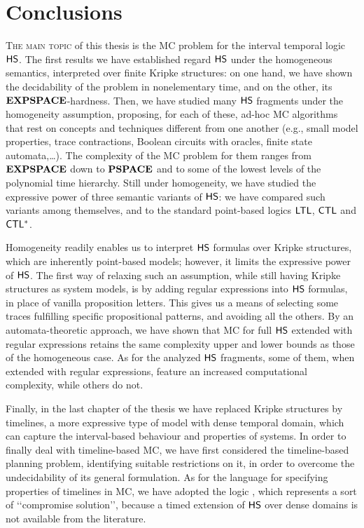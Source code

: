 \chapter{Conclusions}\label{chap:concl}


\lettrine[lines=3]{T}{he main topic} of this thesis is the MC problem for the interval temporal logic $\text{\sffamily HS}$.
The first results we have established regard $\text{\sffamily HS}$ under the homogeneous semantics, interpreted over finite Kripke structures: on one hand, we have shown the decidability of the problem 
in nonelementary time, and on the other, its $\textbf{EXPSPACE}$-hardness.
Then, we have studied many $\text{\sffamily HS}$ fragments under the homogeneity assumption, proposing, for each of these,
ad-hoc MC algorithms that rest on concepts and techniques different from one another (e.g., small model properties, trace contractions, Boolean circuits with oracles, finite state automata,\ldots). The complexity of the MC problem for them ranges from $\textbf{EXPSPACE}$ down to $\textbf{PSPACE}$ and to some of the lowest levels of the polynomial time hierarchy. 
Still under homogeneity, we have studied the expressive power of three semantic variants of $\text{\sffamily HS}$: we have compared such variants among themselves, and to the standard point-based logics $\text{\sffamily LTL}$, $\text{\sffamily CTL}$ and $\text{\sffamily CTL$^{*}$}$.

Homogeneity readily enables us to interpret $\text{\sffamily HS}$ formulas over Kripke structures, which are inherently point-based models; however, it limits the expressive power of $\text{\sffamily HS}$. The first way of relaxing such an assumption, while still having Kripke structures as system models, is by adding regular expressions into $\text{\sffamily HS}$ formulas, in place of vanilla proposition letters. This gives us a means of selecting some traces fulfilling specific propositional patterns, and avoiding all the others. By an automata-theoretic approach, we have shown that MC for full $\text{\sffamily HS}$ extended with regular expressions retains the same complexity upper and lower bounds as those of the homogeneous case.
As for the analyzed $\text{\sffamily HS}$ fragments, some of them, when extended with regular expressions, feature an increased computational complexity, while others do not.

Finally, in the last chapter of the thesis
we have replaced Kripke structures by timelines, a more expressive type of model with dense temporal domain, which can capture the interval-based behaviour and properties of systems.
In order to finally deal with timeline-based MC, we have first considered
the timeline-based planning problem,  
identifying suitable restrictions on it, in order to overcome the undecidability of its general formulation.
As for the language for specifying properties of timelines in MC, we have adopted the logic \MITL, which represents a sort of \lq\lq compromise solution\rq\rq , because a timed extension of $\text{\sffamily HS}$ over dense domains is not available from the literature.

